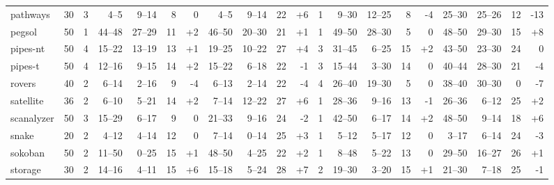 \documentclass{article}
\begin{document}
\begin{table}[h]
\begin{tabular}{l@{}rr|rrrr|rrrr|r|rrrr|rrrr}
      pathways &     30 &   3 &     4--5 &   9--14 &   8 &                 0 &     4--5 &   9--14 &  22 &   {\color{blue}+6} &   1 &     9--30 &  12--25 &   8 &    {\color{red}-4} &    25--30 &  25--26 &  12 &   {\color{red}-13} \\
        pegsol &     50 &   1 &   44--48 &  27--29 &  11 &  {\color{blue}+2} &   46--50 &  20--30 &  21 &   {\color{blue}+1} &   1 &    49--50 &  28--30 &   5 &                  0 &    48--50 &  29--30 &  15 &   {\color{blue}+8} \\
      pipes-nt &     50 &   4 &   15--22 &  13--19 &  13 &  {\color{blue}+1} &   19--25 &  10--22 &  27 &   {\color{blue}+4} &   3 &    31--45 &   6--25 &  15 &   {\color{blue}+2} &    43--50 &  23--30 &  24 &                  0 \\
       pipes-t &     50 &   4 &   12--16 &   9--15 &  14 &  {\color{blue}+2} &   15--22 &   6--18 &  22 &    {\color{red}-1} &   3 &    15--44 &   3--30 &  14 &                  0 &    40--44 &  28--30 &  21 &    {\color{red}-4} \\
        rovers &     40 &   2 &    6--14 &   2--16 &   9 &   {\color{red}-4} &    6--13 &   2--14 &  22 &    {\color{red}-4} &   4 &    26--40 &  19--30 &   5 &                  0 &    38--40 &  30--30 &   0 &    {\color{red}-7} \\
     satellite &     36 &   2 &    6--10 &   5--21 &  14 &  {\color{blue}+2} &    7--14 &  12--22 &  27 &   {\color{blue}+6} &   1 &    28--36 &   9--16 &  13 &    {\color{red}-1} &    26--36 &   6--12 &  25 &   {\color{blue}+2} \\
    scanalyzer &     50 &   3 &   15--29 &   6--17 &   9 &                 0 &   21--33 &   9--16 &  24 &    {\color{red}-2} &   1 &    42--50 &   6--17 &  14 &   {\color{blue}+2} &    48--50 &   9--14 &  18 &   {\color{blue}+6} \\
         snake &     20 &   2 &    4--12 &   4--14 &  12 &                 0 &    7--14 &   0--14 &  25 &   {\color{blue}+3} &   1 &     5--12 &   5--17 &  12 &                  0 &     3--17 &   6--14 &  24 &    {\color{red}-3} \\
       sokoban &     50 &   2 &   11--50 &   0--25 &  15 &  {\color{blue}+1} &   48--50 &   4--25 &  22 &   {\color{blue}+2} &   1 &     8--48 &   5--22 &  13 &                  0 &    29--50 &  16--27 &  26 &   {\color{blue}+1} \\
       storage &     30 &   2 &   14--16 &   4--11 &  15 &  {\color{blue}+6} &   15--18 &   5--24 &  28 &   {\color{blue}+7} &   2 &    19--30 &   3--20 &  15 &   {\color{blue}+1} &    21--30 &   7--18 &  25 &    {\color{red}-1} \\

\end{tabular}
\end{table}
\end{document}
